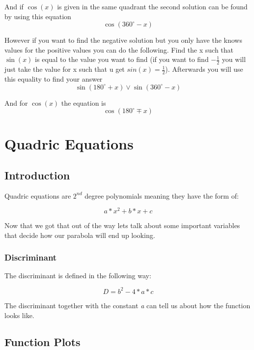 \documentclass[a4paper, 15pt]{article}
\begin{document}
			\noindent And if $\cos(x)$ is given in the same quadrant the second solution can be found by using this equation
				\[\cos(360^{\circ} - x)\]

			\hline \vspace{3mm}

			\noindent However if you want to find the negative solution but you only have the knows values for the positive values you can do the following. Find the x such that $\sin(x)$ is equal to the value you want to find (if you want to find
			$-\frac{1}{2}$ you will just take the value for x such that u get $sin(x) = \frac{1}{2}$). Afterwards you will use this equality to find your answer
				\[\sin(180^{\circ} + x) \lor \sin(360^{\circ} - x)\]

			\noindent And for $\cos(x)$ the equation is
				\[\cos(180^{\circ} \mp x)\]
	\section{Quadric Equations}
		\subsection{Introduction}
			\noindent Quadric equations are $2^{nd}$ degree polynomials meaning they have the form of:
			
			\begin{equation*}
				a*x^2 + b*x + c
			\end{equation*}

			\noindent Now that we got that out of the way lets talk about some important variables that decide how our parabola will end up looking.

			\subsubsection{Discriminant}
				\noindent The discriminant is defined in the following way:
				
				\begin{equation*}
					D = b^2 - 4*a*c
				\end{equation*}

				\noindent The discriminant together with the constant \emph{a} can tell us about how the function looks like.
			
		\subsection{Function Plots}
\end{document}
